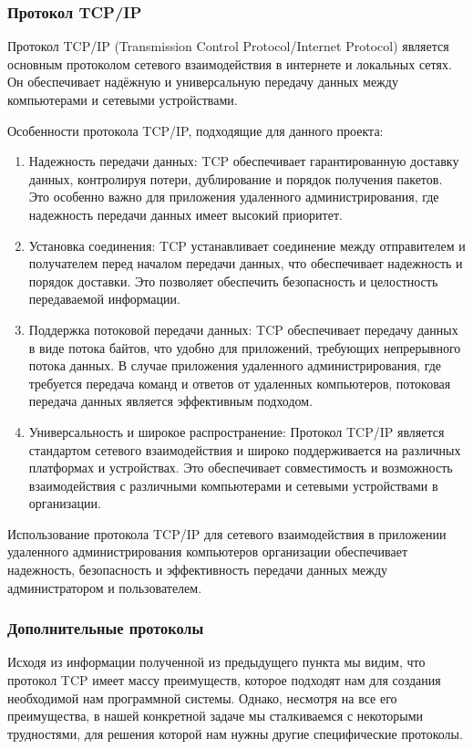 \subsubsection{Протокол TCP/IP}

Протокол TCP/IP (Transmission Control Protocol/Internet Protocol) является основным протоколом сетевого взаимодействия в интернете и локальных сетях. Он обеспечивает надёжную и универсальную передачу данных между компьютерами и сетевыми устройствами.

Особенности протокола TCP/IP, подходящие для данного проекта:
\begin{enumerate}
	\item Надежность передачи данных: TCP обеспечивает гарантированную доставку данных, контролируя потери, дублирование и порядок получения пакетов. Это особенно важно для приложения удаленного администрирования, где надежность передачи данных имеет высокий приоритет.

	\item Установка соединения: TCP устанавливает соединение между отправителем и получателем перед началом передачи данных, что обеспечивает надежность и порядок доставки. Это позволяет обеспечить безопасность и целостность передаваемой информации.

	\item Поддержка потоковой передачи данных: TCP обеспечивает передачу данных в виде потока байтов, что удобно для приложений, требующих непрерывного потока данных. В случае приложения удаленного администрирования, где требуется передача команд и ответов от удаленных компьютеров, потоковая передача данных является эффективным подходом.

	\item Универсальность и широкое распространение: Протокол TCP/IP является стандартом сетевого взаимодействия и широко поддерживается на различных платформах и устройствах. Это обеспечивает совместимость и возможность взаимодействия с различными компьютерами и сетевыми устройствами в организации.
\end{enumerate}

Использование протокола TCP/IP для сетевого взаимодействия в приложении удаленного администрирования компьютеров организации обеспечивает надежность, безопасность и эффективность передачи данных между администратором и пользователем.

\subsubsection{Дополнительные протоколы}
Исходя из информации полученной из предыдущего пункта мы видим, что протокол TCP имеет массу преимуществ, которое подходят нам для создания необходимой нам программной системы. Однако, несмотря на все его преимущества, в нашей конкретной задаче мы сталкиваемся с некоторыми трудностями, для решения которой нам нужны другие специфические протоколы.

